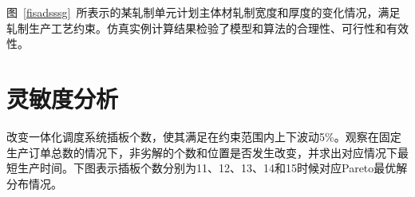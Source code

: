 \documentclass{whutmod}
\begin{document}
 图~\ref{fisadsssg}~所表示的某轧制单元计划主体材轧制宽度和厚度的变化情况，满足轧制生产工艺约束。仿真实例计算结果检验了模型和算法的合理性、可行性和有效性。


  	\section{灵敏度分析}
 改变一体化调度系统插板个数，使其满足在约束范围内上下波动5\%。观察在固定生产订单总数的情况下，非劣解的个数和位置是否发生改变，并求出对应情况下最短生产时间。下图表示插板个数分别为11、12、13、14和15时候对应Pareto最优解分布情况。

 
 	\begin{figure}[H]
 	\centering
 \end{figure}	
\end{document}
